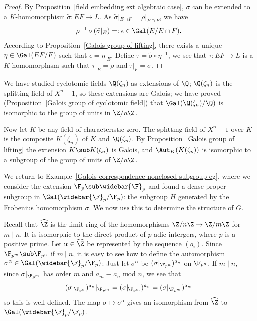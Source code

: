 \begin{proof}
By Proposition~\ref{field embedding ext algebraic case}, $\sigma$ can be extended to a $K$-homomorphism $\widetilde{\sigma}:EF\to L$. As $\widetilde{\sigma}|_{E\cap F}=\rho|_{E\cap F}$, we have
\[\rho^{-1}\circ(\widetilde{\sigma}|_{E})=:\epsilon\in\Gal(E/E\cap F).\] According to Proposition~\ref{Galois group of lifting}, there exists a unique $\eta\in\Gal(EF/F)$ such that $\epsilon=\eta|_{E}$. Define $\tau=\widetilde{\sigma}\circ\eta^{-1}$, we see that $\tau:EF\to L$ is a $K$-homomorphism such that $\tau|_{E}=\rho$ and $\tau|_{F}=\sigma$.
\end{proof}
\begin{example}
We have studied cyclotomic fields $\Q(\zeta_n)$ as extensions of $\Q$; $\Q(\zeta_n)$ is the splitting field of $X^n-1$, so these extensions are Galois; we have proved (Proposition~\ref{Galois group of cyclotomic field}) that $\Gal(\Q(\zeta_n)/\Q)$ is isomorphic to the group of units in $\Z/n\Z$.\par
Now let $K$ be any field of characteristic zero. The splitting field of $X^n-1$ over $K$ is the composite $K(\zeta_n)$ of $K$ and $\Q(\zeta_n)$. By Proposition~\ref{Galois group of lifting} the extension $K\sub K(\zeta_n)$ is Galois, and $\Aut_K(K(\zeta_n))$ is isomorphic to a subgroup of the group of units of $\Z/n\Z$.
\end{example}
\begin{example}
We return to Example~\ref{Galois correspondence nonclosed subgroup eg}, where we consider the extension $\F_p\sub\widebar{\F}_p$ and found a dense proper subgroup in $\Gal(\widebar{\F}_p/\F_p)$: the subgroup $H$ generated by the Frobenius homomorphism $\sigma$. We now use this to determine the structure of $G$.\par
Recall that $\widehat{\Z}$ is the limit ring of the homomorphisms $\Z/n\Z\to\Z/m\Z$ for $m\mid n$. It is isomorphic to the direct product of $p$-adic intergers, where $p$ is a positive prime. Let $\alpha\in\widehat{\Z}$ be represented by the sequence $(a_i)$. Since $\F_{p^m}\sub\F_{p^{n}}$ if $m\mid n$, it is easy to see how to define the automorphism $\sigma^\alpha\in\Gal(\widebar{\F}_p/\F_p)$: Just let $\sigma^{\alpha}$ be $(\sigma|_{\F_{p^n}})^{a_n}$ on $\F_{p^n}$. If $m\mid n$, since $\sigma|_{\F_{p^m}}$ has order $m$ and $a_m\equiv a_n$ mod $n$, we see that
\[(\sigma|_{\F_{p^n}})^{a_n}|_{\F_{p^m}}=(\sigma|_{\F_{p^m}})^{a_n}=(\sigma|_{\F_{p^m}})^{a_m}\]
so this is well-defined. The map $\sigma\mapsto\sigma^\alpha$ gives an isomorphism from $\widehat{\Z}$ to $\Gal(\widebar{\F}_p/\F_p)$.
\end{example}

